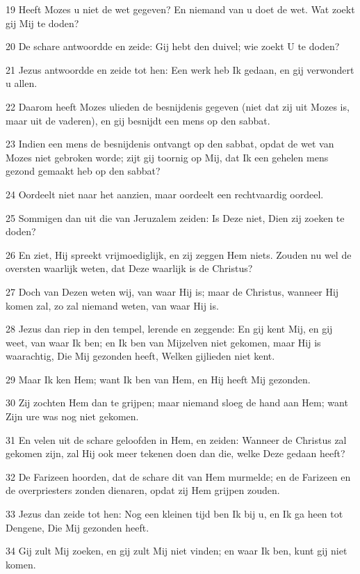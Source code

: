 \par 19 Heeft Mozes u niet de wet gegeven? En niemand van u doet de wet. Wat zoekt gij Mij te doden?
\par 20 De schare antwoordde en zeide: Gij hebt den duivel; wie zoekt U te doden?
\par 21 Jezus antwoordde en zeide tot hen: Een werk heb Ik gedaan, en gij verwondert u allen.
\par 22 Daarom heeft Mozes ulieden de besnijdenis gegeven (niet dat zij uit Mozes is, maar uit de vaderen), en gij besnijdt een mens op den sabbat.
\par 23 Indien een mens de besnijdenis ontvangt op den sabbat, opdat de wet van Mozes niet gebroken worde; zijt gij toornig op Mij, dat Ik een gehelen mens gezond gemaakt heb op den sabbat?
\par 24 Oordeelt niet naar het aanzien, maar oordeelt een rechtvaardig oordeel.
\par 25 Sommigen dan uit die van Jeruzalem zeiden: Is Deze niet, Dien zij zoeken te doden?
\par 26 En ziet, Hij spreekt vrijmoediglijk, en zij zeggen Hem niets. Zouden nu wel de oversten waarlijk weten, dat Deze waarlijk is de Christus?
\par 27 Doch van Dezen weten wij, van waar Hij is; maar de Christus, wanneer Hij komen zal, zo zal niemand weten, van waar Hij is.
\par 28 Jezus dan riep in den tempel, lerende en zeggende: En gij kent Mij, en gij weet, van waar Ik ben; en Ik ben van Mijzelven niet gekomen, maar Hij is waarachtig, Die Mij gezonden heeft, Welken gijlieden niet kent.
\par 29 Maar Ik ken Hem; want Ik ben van Hem, en Hij heeft Mij gezonden.
\par 30 Zij zochten Hem dan te grijpen; maar niemand sloeg de hand aan Hem; want Zijn ure was nog niet gekomen.
\par 31 En velen uit de schare geloofden in Hem, en zeiden: Wanneer de Christus zal gekomen zijn, zal Hij ook meer tekenen doen dan die, welke Deze gedaan heeft?
\par 32 De Farizeen hoorden, dat de schare dit van Hem murmelde; en de Farizeen en de overpriesters zonden dienaren, opdat zij Hem grijpen zouden.
\par 33 Jezus dan zeide tot hen: Nog een kleinen tijd ben Ik bij u, en Ik ga heen tot Dengene, Die Mij gezonden heeft.
\par 34 Gij zult Mij zoeken, en gij zult Mij niet vinden; en waar Ik ben, kunt gij niet komen.
